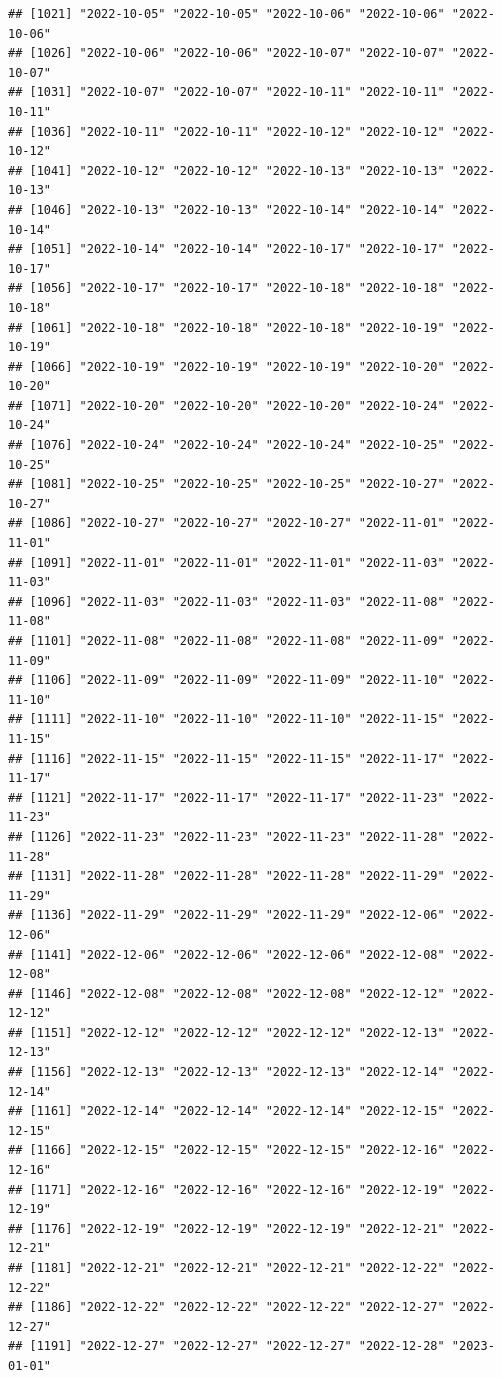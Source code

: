 \documentclass[
]{article}
\begin{document}
\begin{verbatim}
## [1021] "2022-10-05" "2022-10-05" "2022-10-06" "2022-10-06" "2022-10-06"
## [1026] "2022-10-06" "2022-10-06" "2022-10-07" "2022-10-07" "2022-10-07"
## [1031] "2022-10-07" "2022-10-07" "2022-10-11" "2022-10-11" "2022-10-11"
## [1036] "2022-10-11" "2022-10-11" "2022-10-12" "2022-10-12" "2022-10-12"
## [1041] "2022-10-12" "2022-10-12" "2022-10-13" "2022-10-13" "2022-10-13"
## [1046] "2022-10-13" "2022-10-13" "2022-10-14" "2022-10-14" "2022-10-14"
## [1051] "2022-10-14" "2022-10-14" "2022-10-17" "2022-10-17" "2022-10-17"
## [1056] "2022-10-17" "2022-10-17" "2022-10-18" "2022-10-18" "2022-10-18"
## [1061] "2022-10-18" "2022-10-18" "2022-10-18" "2022-10-19" "2022-10-19"
## [1066] "2022-10-19" "2022-10-19" "2022-10-19" "2022-10-20" "2022-10-20"
## [1071] "2022-10-20" "2022-10-20" "2022-10-20" "2022-10-24" "2022-10-24"
## [1076] "2022-10-24" "2022-10-24" "2022-10-24" "2022-10-25" "2022-10-25"
## [1081] "2022-10-25" "2022-10-25" "2022-10-25" "2022-10-27" "2022-10-27"
## [1086] "2022-10-27" "2022-10-27" "2022-10-27" "2022-11-01" "2022-11-01"
## [1091] "2022-11-01" "2022-11-01" "2022-11-01" "2022-11-03" "2022-11-03"
## [1096] "2022-11-03" "2022-11-03" "2022-11-03" "2022-11-08" "2022-11-08"
## [1101] "2022-11-08" "2022-11-08" "2022-11-08" "2022-11-09" "2022-11-09"
## [1106] "2022-11-09" "2022-11-09" "2022-11-09" "2022-11-10" "2022-11-10"
## [1111] "2022-11-10" "2022-11-10" "2022-11-10" "2022-11-15" "2022-11-15"
## [1116] "2022-11-15" "2022-11-15" "2022-11-15" "2022-11-17" "2022-11-17"
## [1121] "2022-11-17" "2022-11-17" "2022-11-17" "2022-11-23" "2022-11-23"
## [1126] "2022-11-23" "2022-11-23" "2022-11-23" "2022-11-28" "2022-11-28"
## [1131] "2022-11-28" "2022-11-28" "2022-11-28" "2022-11-29" "2022-11-29"
## [1136] "2022-11-29" "2022-11-29" "2022-11-29" "2022-12-06" "2022-12-06"
## [1141] "2022-12-06" "2022-12-06" "2022-12-06" "2022-12-08" "2022-12-08"
## [1146] "2022-12-08" "2022-12-08" "2022-12-08" "2022-12-12" "2022-12-12"
## [1151] "2022-12-12" "2022-12-12" "2022-12-12" "2022-12-13" "2022-12-13"
## [1156] "2022-12-13" "2022-12-13" "2022-12-13" "2022-12-14" "2022-12-14"
## [1161] "2022-12-14" "2022-12-14" "2022-12-14" "2022-12-15" "2022-12-15"
## [1166] "2022-12-15" "2022-12-15" "2022-12-15" "2022-12-16" "2022-12-16"
## [1171] "2022-12-16" "2022-12-16" "2022-12-16" "2022-12-19" "2022-12-19"
## [1176] "2022-12-19" "2022-12-19" "2022-12-19" "2022-12-21" "2022-12-21"
## [1181] "2022-12-21" "2022-12-21" "2022-12-21" "2022-12-22" "2022-12-22"
## [1186] "2022-12-22" "2022-12-22" "2022-12-22" "2022-12-27" "2022-12-27"
## [1191] "2022-12-27" "2022-12-27" "2022-12-27" "2022-12-28" "2023-01-01"

\end{verbatim}
\end{document}
